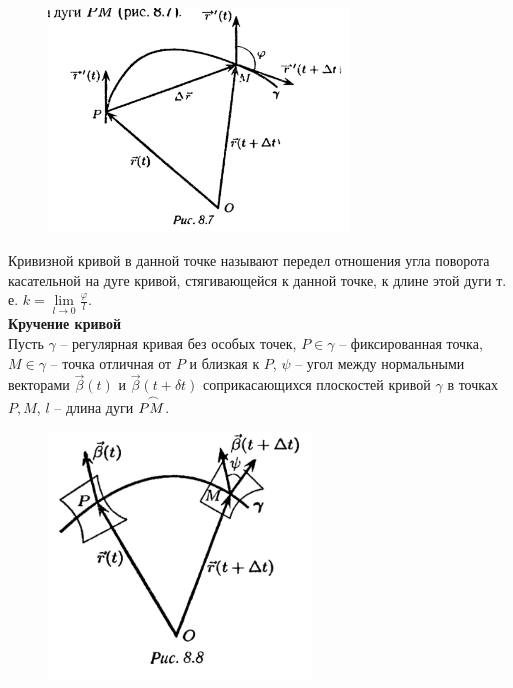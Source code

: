 \documentclass{report}
\begin{document}
\begin{figure}[ht!]
\centering
\includegraphics[width=80mm]{curve6.png}
\end{figure}

Кривизной кривой в данной точке называют передел отношения угла поворота касательной на дуге
кривой, стягивающейся к данной точке, к длине этой дуги т. е. 
$k = \lim\limits_{l \to 0}{\frac{\varphi}{l}}$.\\

\newpage
\noindent
\textbf{Кручение кривой}\\
Пусть $\gamma$ -- регулярная кривая без особых точек, $P \in \gamma$ -- фиксированная точка, 
$M \in \gamma$ -- точка отличная от $P$ и близкая к $P$, $\psi$ -- угол между
нормальными векторами $\overrightarrow{\beta}(t)$ и $\overrightarrow{\beta}(t + \delta t)$
соприкасающихся плоскостей кривой $\gamma$ в точках $P, M$, $l$ -- длина дуги
$\buildrel\, \, \frown\over{PM}$.\\

\begin{figure}[ht!]
\centering
\includegraphics[width=70mm]{curve7.png}
\end{figure}
\end{document}
